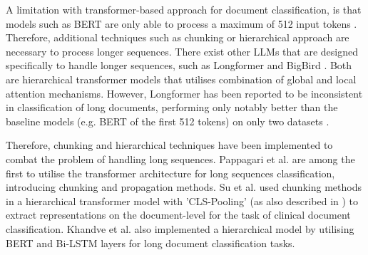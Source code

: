 A limitation with transformer-based approach for document classification, is that models such as BERT are only able to process a maximum of 512 input tokens \cite{devlin-2019-bert}. Therefore, additional techniques such as chunking or hierarchical approach are necessary to process longer sequences. There exist other LLMs that are designed specifically to handle longer sequences, such as Longformer \cite{beltagy-2020-longformer} and BigBird \cite{zaheer-2021-bigbird}. Both are hierarchical transformer models that utilises combination of global and local attention mechanisms. However, Longformer has been reported to be inconsistent in classification of long documents, performing only notably better than the baseline models (e.g. BERT of the first 512 tokens) on only two datasets \cite{park-2022-efficient}.

Therefore, chunking and hierarchical techniques have been implemented to combat the problem of handling long sequences. Pappagari et al. \cite{pappagari-2019-hierarchical} are among the first to utilise the transformer architecture for long sequences classification, introducing chunking and propagation methods. Su et al. \cite{su-2021-classifying} used chunking methods in a hierarchical transformer model with 'CLS-Pooling' (as also described in \cite{adhikari-2019-docbert}) to extract representations on the document-level for the task of clinical document classification. Khandve et al. \cite{khandve-2022-hierarchical-longdoc} also implemented a hierarchical model by utilising BERT and Bi-LSTM layers for long document classification tasks.

